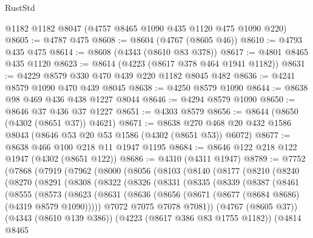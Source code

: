 \begin{lexlean}{RustStd}
\begin{coremodule}
    @1182
    @1182
    @8047
    (@4757 @8465 @1090 @435 @1120 @475 @1090 @220)
@8605 := @4787 @475
@8608 := @8604 (@4767 (@8605 @46))
@8610 := @4793 @435 @475
@8614 := @8608 (@4343 (@8610 @83 @378))
@8617 := @4801 @8465 @435 @1120
@8623 := @8614 (@4223 (@8617 @378 @464 @1941 @1182))
@8631 := @4229 @8579 @330 @470 @439 @220 @1182 @8045 @482
@8636 := @4241 @8579 @1090 @470 @439 @8045
@8638 := @4250 @8579 @1090
@8644 := @8638 @98 @469 @436 @438 @1227 @8044
@8646 := @4294 @8579 @1090
@8650 := @8646 @37 @436 @37 @1227
@8651 := @4303 @8579
@8656 := @8644 (@8650 (@4302 (@8651 @37)) @4621)
@8671 := @8638 @270 @468 @20 @432 @1586 @8043 (@8646 @53 @20 @53 @1586 (@4302 (@8651 @53)) @6072)
@8677 := @8638 @466 @100 @218 @11 @1947 @1195
@8684 := @8646 @122 @218 @122 @1947 (@4302 (@8651 @122))
@8686 := @4310 (@4311 @1947)
@8789 := @7752
    (@7868
      (@7919
        (@7962
          (@8000
            (@8056
              (@8103
                (@8140
                  (@8177
                    (@8210
                      (@8240
                        (@8270
                          (@8291
                            (@8308
                              (@8322
                                (@8326
                                  (@8331
                                    (@8335
                                      (@8339
                                        (@8387
                                          (@8461
                                            (@8555
                                              (@8573
                                                (@8623
                                                  (@8631
                                                    (@8636
                                                      (@8656
                                                        (@8671
                                                          (@8677
                                                            (@8684 @8686)
                                                            (@4319 @8579 @1090)))))
                                                    @7072
                                                    @7075
                                                    @7078
                                                    @7081))
                                                (@4767 (@8605 @37))
                                                (@4343 (@8610 @139 @386))
                                                (@4223 (@8617 @386 @83 @1755 @1182))
                                                (@4814
                                                  @8465

\end{coremodule}
\end{lexlean}
